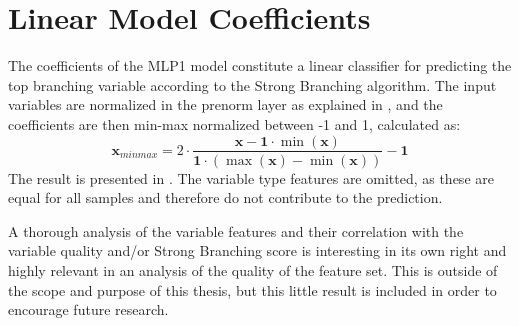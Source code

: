 
\chapter{Linear Model Coefficients}\label{cha:coefficients}

The coefficients of the MLP1 model constitute a linear classifier for predicting the top branching variable according to the Strong Branching algorithm. The input variables are normalized in the prenorm layer as explained in , and the coefficients are then min-max normalized between -1 and 1, calculated as:
\begin{equation}
    \mathbf{x}_{minmax} = 2 \cdot \frac{\mathbf{x} - \mathbf{1} \cdot \min(\mathbf{x})}{\mathbf{1} \cdot (\max(\mathbf{x})- \min(\mathbf{x}) )} - \mathbf{1} 
\end{equation}
The result is presented in . The variable type features are omitted, as these are equal for all samples and therefore do not contribute to the prediction.

A thorough analysis of the variable features and their correlation with the variable quality and/or Strong Branching score is interesting in its own right and highly relevant in an analysis of the quality of the feature set. This is outside of the scope and purpose of this thesis, but this little result is included in order to encourage future research.

